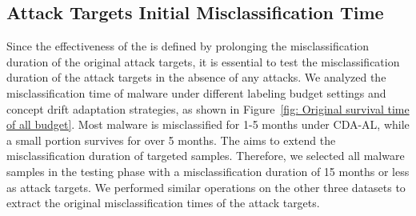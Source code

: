 \begin{itemize}[leftmargin=*]
\end{itemize}



\subsection{Attack Targets Initial Misclassification Time}
\label{Sec: Attack Target Initial Survival Time (APIGraph)}
Since the effectiveness of the \pandora is defined by prolonging the misclassification duration of the original attack targets, it is essential to test the misclassification duration of the attack targets in the absence of any attacks.
We analyzed the misclassification time of malware under different labeling budget settings and concept drift adaptation strategies, as shown in Figure~\ref{fig: Original survival time of all budget}.
Most malware is misclassified for 1-5 months under CDA-AL, while a small portion survives for over 5 months.
The \pandora aims to extend the misclassification duration of targeted samples. 
Therefore, we selected all malware samples in the testing phase with a misclassification duration of 15 months or less as attack targets.
We performed similar operations on the other three datasets to extract the original misclassification times of the attack targets.

